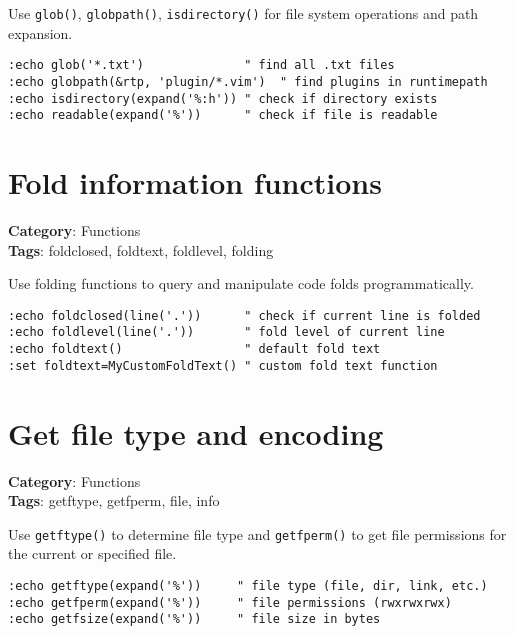 Use {\footnotesize \Verb§glob()§}, {\footnotesize \Verb§globpath()§}, {\footnotesize \Verb§isdirectory()§} for file system operations and path expansion.

\begin{Exa*}{}
\begin{Verbatim}[fontsize=\footnotesize, breaklines, breakanywhere]
:echo glob('*.txt')              " find all .txt files
:echo globpath(&rtp, 'plugin/*.vim')  " find plugins in runtimepath
:echo isdirectory(expand('%:h')) " check if directory exists
:echo readable(expand('%'))      " check if file is readable
\end{Verbatim}
\end{Exa*}

\section{Fold information functions}

\textbf{Category}: Functions\\ \textbf{Tags}: foldclosed, foldtext, foldlevel, folding
\vspace{0.5cm}

Use folding functions to query and manipulate code folds programmatically.

\begin{Exa*}{}
\begin{Verbatim}[fontsize=\footnotesize, breaklines, breakanywhere]
:echo foldclosed(line('.'))      " check if current line is folded
:echo foldlevel(line('.'))       " fold level of current line
:echo foldtext()                 " default fold text
:set foldtext=MyCustomFoldText() " custom fold text function
\end{Verbatim}
\end{Exa*}

\section{Get file type and encoding}

\textbf{Category}: Functions\\ \textbf{Tags}: getftype, getfperm, file, info
\vspace{0.5cm}

Use {\footnotesize \Verb§getftype()§} to determine file type and {\footnotesize \Verb§getfperm()§} to get file permissions for the current or specified file.

\begin{Exa*}{}
\begin{Verbatim}[fontsize=\footnotesize, breaklines, breakanywhere]
:echo getftype(expand('%'))     " file type (file, dir, link, etc.)
:echo getfperm(expand('%'))     " file permissions (rwxrwxrwx)
:echo getfsize(expand('%'))     " file size in bytes
\end{Verbatim}
\end{Exa*}

